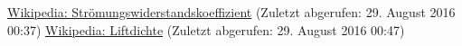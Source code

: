 

\begin{thebibliography}{9}
	\href{https://de.wikipedia.org/wiki/Str%C3%B6mungswiderstandskoeffizient}
		{Wikipedia: Strömungswiderstandskoeffizient} (Zuletzt abgerufen: 29. August 2016 00:37)
	 \href{https://de.wikipedia.org/wiki/Luftdichte}{Wikipedia: Liftdichte} (Zuletzt abgerufen: 29. August 2016 00:47)
\end{thebibliography}

